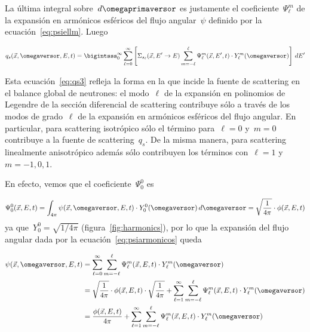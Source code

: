 La última integral sobre~$d\omegaprimaversor$ es justamente el coeficiente~$\Psi_\ell^m$ de la expansión en armónicos esféricos del flujo angular~$\psi$ definido por la ecuación~\eqref{eq:psiellm}. Luego

\begin{equation}
\label{eq:qs3}
q_s(\vec{x}, \omegaversor, E, t) =
\bigintsss_{0}^{\infty} \sum_{\ell=0}^\infty  \left[ \Sigma_{s_\ell}(\vec{x}, E^{\prime} \rightarrow E) 
\sum_{m=-\ell}^{\ell} \Psi_\ell^m (\vec{x}, E^{\prime}, t) \cdot Y_\ell^{m}(\omegaversor)  \right] \, dE^{\prime}
\end{equation}

Esta ecuación~\eqref{eq:qs3} refleja la forma en la que incide la fuente de scattering en el balance global de neutrones:  el modo~$\ell$ de la expansión en polinomios de Legendre de la sección diferencial de scattering contribuye sólo a través de los modos de grado~$\ell$ de la expansión en armónicos esféricos del flujo angular. En particular, para scattering isotrópico sólo el término para~$\ell=0$ y~$m=0$ contribuye a la fuente de scattering~$q_s$. De la misma manera, para scattering linealmente anisotrópico además sólo contribuyen los términos con~$\ell=1$ y~$m=-1,0,1$.

\medskip

En efecto, vemos que el coeficiente~$\Psi_0^0$ es

\begin{equation*}
 \Psi_0^0(\vec{x}, E, t) = \int_{4\pi} \psi(\vec{x}, \omegaversor, E,t) \cdot Y_0^0(\omegaversor) \, d\omegaversor = \sqrt{\frac{1}{4\pi}} \cdot \phi(\vec{x}, E, t)
\end{equation*}
%
ya que~$Y_0^0 = \sqrt{1/4\pi}$ (figura~\ref{fig:harmonics}), por lo que la expansión del flujo angular dada por la ecuación~\eqref{eq:psiarmonicos} queda

\begin{align*}
\psi(\vec{x}, \omegaversor, E, t) &= \sum_{\ell=0}^{\infty} \sum_{m=-\ell}^{\ell} \Psi_\ell^m (\vec{x}, E, t) \cdot Y_{\ell}^{m} ({\omegaversor}) \\
&=  \sqrt{\frac{1}{4\pi}} \cdot \phi(\vec{x}, E, t) \cdot  \sqrt{\frac{1}{4\pi}} + \sum_{\ell=1}^{\infty} \sum_{m=-\ell}^{\ell} \Psi_\ell^m (\vec{x}, E, t) \cdot Y_{\ell}^{m} ({\omegaversor}) \\
&= \frac{\phi(\vec{x}, E, t)}{4\pi} + \sum_{\ell=1}^{\infty} \sum_{m=-\ell}^{\ell} \Psi_\ell^m (\vec{x}, E, t) \cdot Y_{\ell}^{m} ({\omegaversor})
\end{align*}

